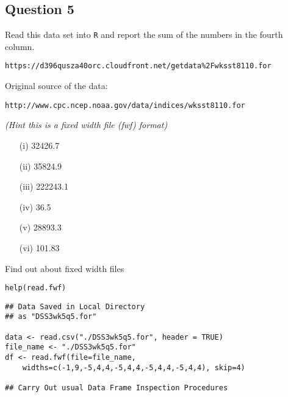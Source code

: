 \documentclass[12pt]{article}
\begin{document}
\subsection*{Question 5}
Read this data set into \texttt{R} and report the sum of the numbers in the fourth column. 
\begin{verbatim}
https://d396qusza40orc.cloudfront.net/getdata%2Fwksst8110.for 
\end{verbatim} 

\noindent Original source of the data:
\begin{verbatim}
http://www.cpc.ncep.noaa.gov/data/indices/wksst8110.for 
\end{verbatim} 

\noindent \textit{(Hint this is a fixed width file (fwf) format)}
\begin{itemize}
\item[(i)] 32426.7
\item[(ii)] 35824.9
\item[(iii)] 222243.1
\item[(iv)] 36.5
\item[(v)] 28893.3
\item[(vi)] 101.83
\end{itemize}

\begin{framed}
\noindent Find out about fixed width files
\begin{verbatim}
help(read.fwf)
\end{verbatim}	
\end{framed}

\begin{framed}
\begin{verbatim}
## Data Saved in Local Directory
## as "DSS3wk5q5.for"

data <- read.csv("./DSS3wk5q5.for", header = TRUE)
file_name <- "./DSS3wk5q5.for"
df <- read.fwf(file=file_name,
    widths=c(-1,9,-5,4,4,-5,4,4,-5,4,4,-5,4,4), skip=4)

## Carry Out usual Data Frame Inspection Procedures
\end{verbatim}	
\end{framed}
\end{document}
